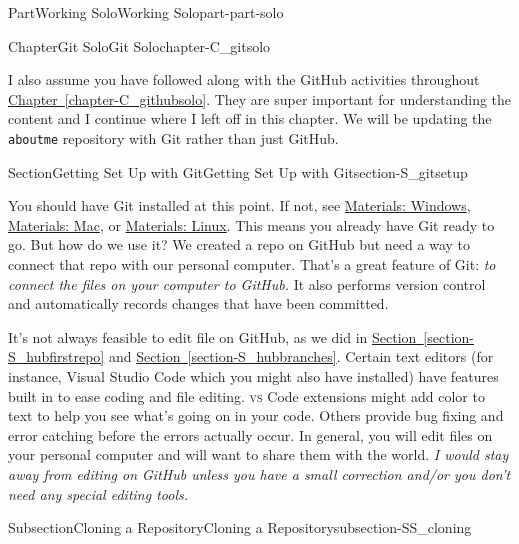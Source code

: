 \documentclass[oneside,10pt,]{book}
\newcommand{\xreffont}{\relax}
\newcommand{\mono}[1]{\texttt{#1}}
\newcommand{\initialism}[1]{\textsc{\MakeLowercase{#1}}}
\begin{document}
\begin{partptx}{Part}{Working Solo}{}{Working Solo}{}{}{part-part-solo}
\begin{chapterptx}{Chapter}{Git Solo}{}{Git Solo}{}{}{chapter-C_gitsolo}
\begin{introduction}{}
I also assume you have followed along with the GitHub activities throughout \hyperref[chapter-C_githubsolo]{Chapter~{\xreffont\ref{chapter-C_githubsolo}}}. They are super important for understanding the content and I continue where I left off in this chapter. We will be updating the \mono{aboutme} repository with Git rather than just GitHub.%
\end{introduction}%
%
%
\typeout{************************************************}
\typeout{************************************************}
%
\begin{sectionptx}{Section}{Getting Set Up with Git}{}{Getting Set Up with Git}{}{}{section-S_gitsetup}
%
%
\begin{introduction}{}%
You should have Git installed at this point. If not, see \hyperref[preface-materials-windows]{Materials: Windows}, \hyperref[preface-materials-mac]{Materials: Mac}, or \hyperref[preface-materials-linux]{Materials: Linux}. This means you already have Git ready to go. But how do we use it? We created a repo on GitHub but need a way to connect that repo with our personal computer. That's a great feature of Git: \emph{to connect the files on your computer to GitHub.} It also performs version control and automatically records changes that have been committed.%
\par
It's not always feasible to edit file on GitHub, as we did in \hyperref[section-S_hubfirstrepo]{Section~{\xreffont\ref{section-S_hubfirstrepo}}} and \hyperref[section-S_hubbranches]{Section~{\xreffont\ref{section-S_hubbranches}}}. Certain text editors (for instance, Visual Studio Code which you might also have installed) have features built in to ease coding and file editing. \initialism{VS} Code extensions might add color to text to help you see what's going on in your code. Others provide bug fixing and error catching before the errors actually occur. In general, you will edit files on your personal computer and will want to share them with the world. \emph{I would stay away from editing on GitHub unless you have a small correction and\slash{}or you don't need any special editing tools.}%
\end{introduction}%
%
%
\typeout{************************************************}
\typeout{************************************************}
%
\begin{subsectionptx}{Subsection}{Cloning a Repository}{}{Cloning a Repository}{}{}{subsection-SS_cloning}

\end{subsectionptx}
\end{sectionptx}
\end{chapterptx}
\end{partptx}
\end{document}
